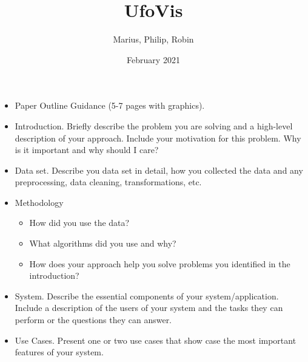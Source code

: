 \documentclass{article}
\title{UfoVis}
\author{Marius, Philip, Robin}
\date{February 2021}
\begin{document}
\maketitle

\begin{itemize}
    \item Paper Outline Guidance (5-7 pages with graphics).
    \item Introduction.  Briefly describe the problem you are solving and a high-level description of your approach.  Include your motivation for this problem.  Why is it important and why should I care? 
    \item Data set.  Describe you data set in detail, how you collected the data and any preprocessing, data cleaning, transformations, etc.
    \item Methodology
    \begin{itemize}
        \item How did you use the data?
        \item What algorithms did you use and why?
        \item How does your approach help you solve problems you identified in the introduction?
    \end{itemize}
    \item System.  Describe the essential components of your system/application.  Include a description of the users of your system and the tasks they can perform or the questions they can answer.
    \item Use Cases.  Present one or two use cases that show case the most important features of your system.
\end{itemize}
\end{document}
